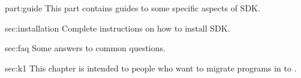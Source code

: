 \begin{partDescription}{part:guide}
  {
    This part contains guides to some specific aspects of \urbi SDK.
  }
\item[sec:installation]
  Complete instructions on how to install \urbi SDK.
\item[sec:faq]
  Some answers to common questions.
\item[sec:k1] This chapter is intended to people who want to migrate
  programs in  to .
\end{partDescription}

